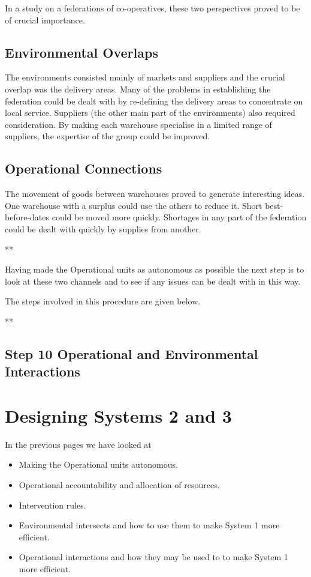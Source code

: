 In a study on a federations of co-operatives, these two perspectives proved to be of crucial importance.

\subsection*{Environmental Overlaps}
The environments consisted mainly of markets and suppliers and the crucial overlap was the delivery areas. Many of the problems in establishing the federation could be dealt with by re-defining the delivery areas to concentrate on local service. Suppliers (the other main part of the environments) also required consideration. By making each warehouse specialise in a limited range of suppliers, the expertise of the group could be improved.

\subsection*{Operational Connections}
The movement of goods between warehouses proved to generate interesting ideas. One warehouse with a surplus could use the others to reduce it. Short best-before-dates could be moved more quickly. Shortages in any part of the federation could be dealt with quickly by supplies from another.

**

Having made the Operational units as autonomous as possible the next step is to look at these two channels and to see if any issues can be dealt with in this way.

The steps involved in this procedure are given below.

**

\subsection*{Step 10 Operational and Environmental Interactions}

\section*{Designing Systems 2 and 3}
In the previous pages we have looked at

\begin{itemize}
  \item Making the Operational units autonomous.

  \item Operational accountability and allocation of resources.

  \item Intervention rules.

  \item Environmental intersects and how to use them to make System 1 more efficient.

  \item Operational interactions and how they may be used to to make System 1 more efficient.

\end{itemize}

